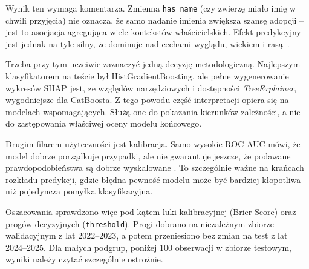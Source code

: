

Wynik ten wymaga komentarza. Zmienna \texttt{has\_name} (czy zwierzę miało imię w chwili przyjęcia) nie oznacza, że samo nadanie imienia zwiększa szansę adopcji -- jest to asocjacja agregująca wiele kontekstów właścicielskich. Efekt predykcyjny jest jednak na tyle silny, że dominuje nad cechami wyglądu, wiekiem i rasą~\cite{Lundberg2020}.


Trzeba przy tym uczciwie zaznaczyć jedną decyzję metodologiczną. Najlepszym klasyfikatorem na teście był HistGradientBoosting, ale pełne wygenerowanie wykresów SHAP jest, ze względów narzędziowych i dostępności \emph{TreeExplainer}, wygodniejsze dla CatBoosta. Z tego powodu część interpretacji opiera się na modelach wspomagających. Służą one do pokazania kierunków zależności, a nie do zastępowania właściwej oceny modelu końcowego.

Drugim filarem użyteczności jest kalibracja. Samo wysokie ROC-AUC mówi, że model dobrze porządkuje przypadki, ale nie gwarantuje jeszcze, że podawane prawdopodobieństwa są dobrze wyskalowane \cite{Fawcett2006,Brier1950}. To szczególnie ważne na krańcach rozkładu predykcji, gdzie błędna pewność modelu może być bardziej kłopotliwa niż pojedyncza pomyłka klasyfikacyjna.


Oszacowania sprawdzono więc pod kątem luki kalibracyjnej (Brier Score) oraz progów decyzyjnych (\texttt{threshold}). Progi dobrano na niezależnym zbiorze walidacyjnym z lat 2022--2023, a potem przeniesiono bez zmian na test z lat 2024--2025. Dla małych podgrup, poniżej 100 obserwacji w zbiorze testowym, wyniki należy czytać szczególnie ostrożnie.

